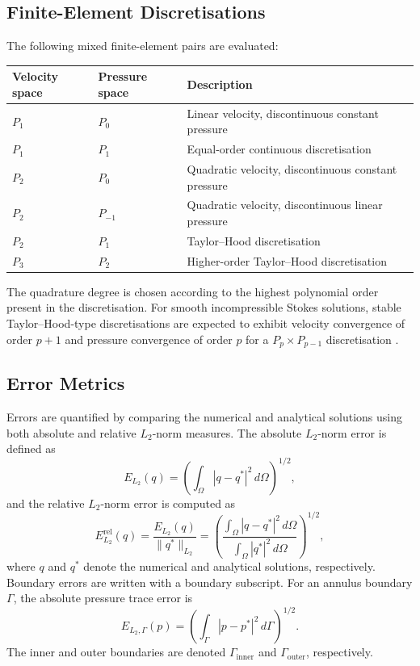 \documentclass[gmd, manuscript]{copernicus}
\begin{document}
\subsection{Finite-Element Discretisations}

The following mixed finite-element pairs are evaluated:
\begin{table}[H]
\centering
\begin{tabular}{lll}
\toprule
Velocity space & Pressure space & Description \\
\midrule
\(P_1\) & \(P_0\) & Linear velocity, discontinuous constant pressure \\
\(P_1\) & \(P_1\) & Equal-order continuous discretisation \\
\(P_2\) & \(P_0\) & Quadratic velocity, discontinuous constant pressure \\
\(P_2\) & \(P_{-1}\) & Quadratic velocity, discontinuous linear pressure \\
\(P_2\) & \(P_1\) & Taylor--Hood discretisation \\
\(P_3\) & \(P_2\) & Higher-order Taylor--Hood discretisation \\
\bottomrule
\end{tabular}
\end{table}

The quadrature degree is chosen according to the highest polynomial order present in the discretisation.
For smooth incompressible Stokes solutions, stable Taylor--Hood-type discretisations are expected to exhibit 
velocity convergence of order \(p+1\) and pressure convergence of order \(p\) for a \(P_{p}\times P_{p-1}\) 
discretisation \citep{girault1986,boffi2013}.

\subsection{Error Metrics}

Errors are quantified by comparing the numerical and analytical
solutions using both absolute and relative \(L_2\)-norm measures.
The absolute \(L_2\)-norm error is defined as
\begin{equation}
  E_{L_2}(q)
  =
  \left(
  \int_\Omega |q-q^*|^2 \, d\Omega
  \right)^{1/2},
\end{equation}
and the relative \(L_2\)-norm error is computed as
\begin{equation}
  E_{L_2}^{\mathrm{rel}}(q)
  =
  \frac{E_{L_2}(q)}{\|q^*\|_{L_2}}
  =
  \left(
  \frac{\int_\Omega |q-q^*|^2\,d\Omega}
       {\int_\Omega |q^*|^2\,d\Omega}
  \right)^{1/2},
\end{equation}
where \(q\) and \(q^*\) denote the numerical and analytical
solutions, respectively.
Boundary errors are written with a boundary subscript. For an annulus boundary
\(\Gamma\), the absolute pressure trace error is
\begin{equation}
  E_{L_2,\Gamma}(p)
  =
  \left(
  \int_\Gamma |p-p^*|^2\,d\Gamma
  \right)^{1/2}.
\end{equation}
The inner and outer boundaries are denoted
\(\Gamma_{\mathrm{inner}}\) and \(\Gamma_{\mathrm{outer}}\), respectively.
\end{document}
